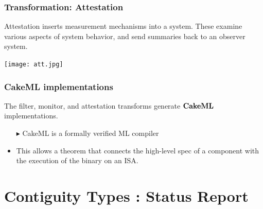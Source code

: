 \documentclass{beamer}
\newcommand{\konst}[1]{\ensuremath{\mbox{\bf{#1}}}}
\begin{document}
\begin{frame}\frametitle{Transformation: Attestation}

Attestation inserts measurement mechanisms into a system. These
examine various aspects of system behavior, and send summaries back to
an observer system.





\hspace*{10mm}\texttt{[image: att.jpg]}


\end{frame}

\begin{frame}\frametitle{CakeML implementations}

  The filter, monitor, and attestation transforms generate \konst{CakeML} implementations.

\begin{itemize}
 \item [$\blacktriangleright$] CakeML is a formally verified ML compiler

\item This allows a theorem that connects the high-level spec of a
  component with the execution of the binary on an ISA.
\end{itemize}

\end{frame}


\section{Contiguity Types : Status Report}
\end{document}
